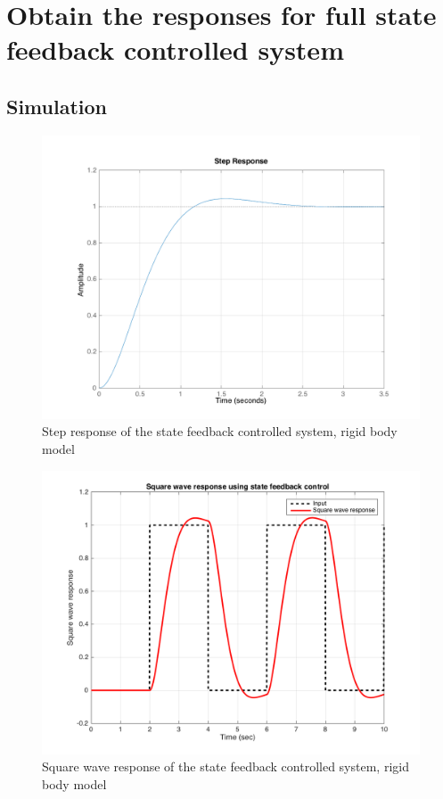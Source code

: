 \documentclass[a4paper, 12pt]{article}
\begin{document}
\section{Obtain the responses for full state feedback controlled system}
\subsection{Simulation}
\begin{figure}[!htbp]
\centering
\includegraphics[scale = 0.3]{StepResponseStateFeedback}
\caption{Step response of the state feedback controlled system, rigid body model}
\label{StepResponseStateFeedback}
\end{figure}

\begin{figure}[!htbp]
\centering
\includegraphics[scale = 0.3]{CubicResponseStateFeedback}
\caption{Square wave response of the state feedback controlled system, rigid body model}
\label{CubicResponseStateFeedback}
\end{figure}
\end{document}
